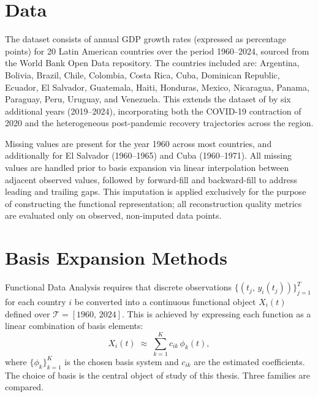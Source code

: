 
\section{Data}
\label{sec:data}

The dataset consists of annual GDP growth rates (expressed as percentage points)
for 20 Latin American countries over the period 1960--2024, sourced from the World
Bank Open Data repository. The countries included are: Argentina, Bolivia, Brazil,
Chile, Colombia, Costa Rica, Cuba, Dominican Republic, Ecuador, El Salvador,
Guatemala, Haiti, Honduras, Mexico, Nicaragua, Panama, Paraguay, Peru, Uruguay,
and Venezuela. This extends the dataset of \cite{padilla2020} by six additional
years (2019--2024), incorporating both the COVID-19 contraction of 2020 and the
heterogeneous post-pandemic recovery trajectories across the region.

Missing values are present for the year 1960 across most countries, and
additionally for El Salvador (1960--1965) and Cuba (1960--1971). All missing
values are handled prior to basis expansion via linear interpolation between
adjacent observed values, followed by forward-fill and backward-fill to address
leading and trailing gaps. This imputation is applied exclusively for the purpose
of constructing the functional representation; all reconstruction quality metrics
are evaluated only on observed, non-imputed data points.

\section{Basis Expansion Methods}
\label{sec:bases}

Functional Data Analysis requires that discrete observations
$\{(t_j,\, y_i(t_j))\}_{j=1}^{T}$ for each country $i$ be converted into a
continuous functional object $X_i(t)$ defined over
$\mathcal{T} = [1960,\, 2024]$. This is achieved by expressing each function
as a linear combination of basis elements:
\begin{equation}
    X_i(t) \;\approx\; \sum_{k=1}^{K} c_{ik}\,\phi_k(t),
    \label{eq:basis_expansion}
\end{equation}
where $\{\phi_k\}_{k=1}^{K}$ is the chosen basis system and $c_{ik}$ are the
estimated coefficients. The choice of basis is the central object of study of
this thesis. Three families are compared.

